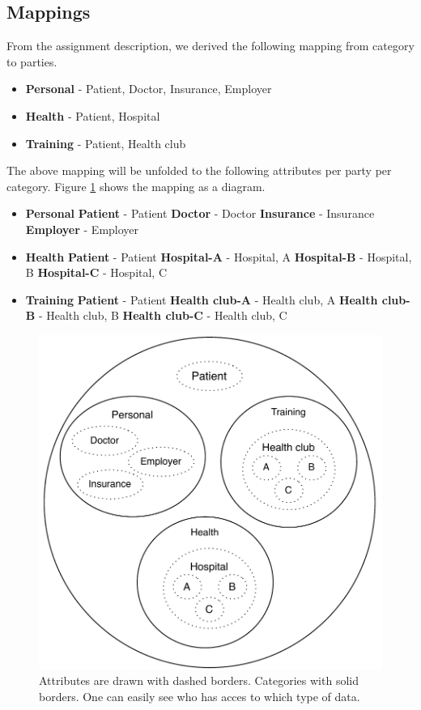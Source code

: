 \documentclass[a4paper]{article}
\begin{document}
	\subsection{Mappings}\label{sec:mappings}
		From the assignment description, we derived the following mapping from category to parties.
		
		\begin{itemize}
			\item \textbf{Personal} - Patient, Doctor, Insurance, Employer
			\item \textbf{Health} - Patient, Hospital
			\item \textbf{Training} - Patient, Health club
		\end{itemize}
		
		The above mapping will be unfolded to the following attributes per party per category. Figure \ref{fig:mapping} shows the mapping as a diagram.
		
		\begin{itemize}
			\item \textbf{Personal}
				\subitem \textbf{Patient} - Patient
				\subitem \textbf{Doctor} - Doctor
				\subitem \textbf{Insurance} - Insurance
				\subitem \textbf{Employer} - Employer
			\item \textbf{Health}
				\subitem \textbf{Patient} - Patient
				\subitem \textbf{Hospital-A} - Hospital, A
				\subitem \textbf{Hospital-B} - Hospital, B
				\subitem \textbf{Hospital-C} - Hospital, C
			\item \textbf{Training}
				\subitem \textbf{Patient} - Patient
				\subitem \textbf{Health club-A} - Health club, A
				\subitem \textbf{Health club-B} - Health club, B
				\subitem \textbf{Health club-C} - Health club, C
		\end{itemize}
	
		\begin{figure}[H]
	        \centering
            \includegraphics[width=0.6\columnwidth]{figures/mapping.pdf}
	     	\caption{Attributes are drawn with dashed borders. Categories with solid borders. One can easily see who has acces to which type of data.}
			\label{fig:mapping}
		\end{figure}
	
\end{document}
